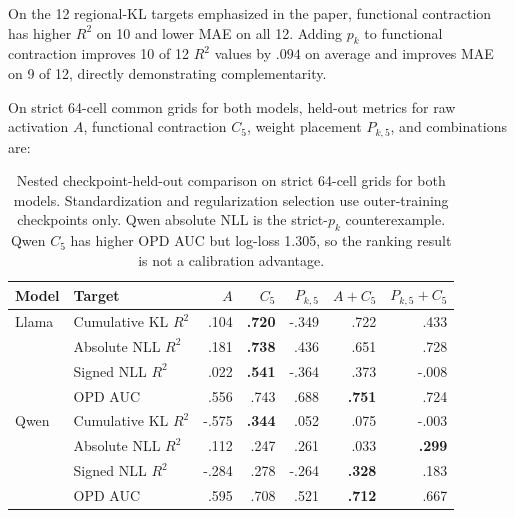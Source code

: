 \documentclass[letterpaper]{article} %
\begin{document}
On the 12 regional-KL targets emphasized in the paper, functional contraction has higher
$R^2$ on 10 and lower MAE on all 12. Adding $p_k$ to functional contraction improves
10 of 12 $R^2$ values by $.094$ on average and improves MAE on 9 of 12, directly
demonstrating complementarity.

On strict 64-cell common grids for both models, held-out metrics for raw activation
$A$, functional contraction $C_5$, weight placement $P_{k,5}$, and combinations are:
\begin{table}[t]
\centering
\small
\setlength{\tabcolsep}{3.5pt}
\begin{tabular}{llrrrrr}
\toprule
Model & Target & $A$ & $C_5$ & $P_{k,5}$ & $A+C_5$ & $P_{k,5}+C_5$ \\
\midrule
Llama & Cumulative KL $R^2$ & .104 & \textbf{.720} & -.349 & .722 & .433 \\
 & Absolute NLL $R^2$ & .181 & \textbf{.738} & .436 & .651 & .728 \\
 & Signed NLL $R^2$ & .022 & \textbf{.541} & -.364 & .373 & -.008 \\
 & OPD AUC & .556 & .743 & .688 & \textbf{.751} & .724 \\
Qwen & Cumulative KL $R^2$ & -.575 & \textbf{.344} & .052 & .075 & -.003 \\
 & Absolute NLL $R^2$ & .112 & .247 & .261 & .033 & \textbf{.299} \\
 & Signed NLL $R^2$ & -.284 & .278 & -.264 & \textbf{.328} & .183 \\
 & OPD AUC & .595 & .708 & .521 & \textbf{.712} & .667 \\
\bottomrule
\end{tabular}
\caption{Nested checkpoint-held-out comparison on strict 64-cell grids for both models.
Standardization and regularization selection use outer-training checkpoints only.
Qwen absolute NLL is the strict-$p_k$ counterexample. Qwen $C_5$ has higher OPD AUC
but log-loss 1.305, so the ranking result is not a calibration advantage.}
\label{tab:supp-rr5}
\end{table}
\end{document}
